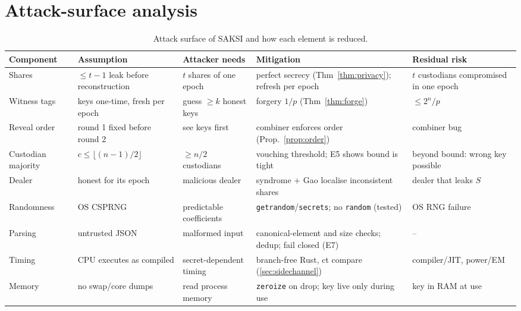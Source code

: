 \documentclass[11pt,a4paper]{article}
\theoremstyle{plain}
\theoremstyle{definition}
\begin{document}
\section{Attack-surface analysis}\label{sec:surface}

\begin{table}[ht]
\centering\small
\begin{tabularx}{\textwidth}{@{}>{\raggedright\arraybackslash}p{2.3cm}>{\raggedright\arraybackslash}X>{\raggedright\arraybackslash}X>{\raggedright\arraybackslash}X>{\raggedright\arraybackslash}p{2.4cm}@{}}
\toprule
Component & Assumption & Attacker needs & Mitigation & Residual risk\\
\midrule
Shares & $\le t-1$ leak before reconstruction & $t$ shares of one epoch & perfect secrecy (Thm~\ref{thm:privacy}); refresh per epoch & $t$ custodians compromised in one epoch\\
Witness tags & keys one-time, fresh per epoch & guess $\ge k$ honest keys & forgery $1/p$ (Thm~\ref{thm:forge}) & $\le 2^n/p$\\
Reveal order & round 1 fixed before round 2 & see keys first & combiner enforces order (Prop.~\ref{prop:order}) & combiner bug\\
Custodian majority & $c\le\lfloor(n-1)/2\rfloor$ & $\ge n/2$ custodians & vouching threshold; E5 shows bound is tight & beyond bound: wrong key possible\\
Dealer & honest for its epoch & malicious dealer & syndrome + Gao localise inconsistent shares & dealer that leaks $S$\\
Randomness & OS CSPRNG & predictable coefficients & \texttt{getrandom}/\texttt{secrets}; no \texttt{random} (tested) & OS RNG failure\\
Parsing & untrusted JSON & malformed input & canonical-element and size checks; dedup; fail closed (E7) & --\\
Timing & CPU executes as compiled & secret-dependent timing & branch-free Rust, ct compare (\cref{sec:sidechannel}) & compiler/JIT, power/EM\\
Memory & no swap/core dumps & read process memory & \texttt{zeroize} on drop; key live only during use & key in RAM at use\\
\bottomrule
\end{tabularx}
\caption{Attack surface of SAKSI and how each element is reduced.}
\label{tab:surface}
\end{table}
\end{document}
